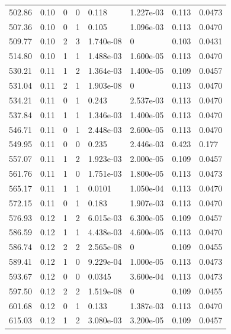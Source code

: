 \documentclass[preview]{standalone}
\begin{document}
{{{\begin{tabular}{L{1.2cm}C{1.2cm} C{0.3cm}C{0.5cm} C{1.4cm}C{1.4cm} C{1.4cm}C{1.4cm}}
  502.86  &  0.10  & 0     &  0 &  0.118  & 1.227e-03  & 0.113 &  0.0473   \\ 
  507.36  &  0.10  & 0     &  1 &  0.105  & 1.096e-03  & 0.113 &  0.0470   \\ 
  509.77  &  0.10  & 2     &  3 &  1.740e-08  & 0  & 0.103 &  0.0431   \\ 
  514.80  &  0.10  & 1     &  1 &  1.488e-03  & 1.600e-05  & 0.113 &  0.0470   \\ 
  530.21  &  0.11  & 1     &  2 &  1.364e-03  & 1.400e-05  & 0.109 &  0.0457   \\ 
  531.04  &  0.11  & 2     &  1 &  1.903e-08  & 0  & 0.113 &  0.0470   \\ 
  534.21  &  0.11  & 0     &  1 &  0.243  & 2.537e-03  & 0.113 &  0.0470   \\ 
  537.84  &  0.11  & 1     &  1 &  1.346e-03  & 1.400e-05  & 0.113 &  0.0470   \\ 
  546.71  &  0.11  & 0     &  1 &  2.448e-03  & 2.600e-05  & 0.113 &  0.0470   \\ 
  549.95  &  0.11  & 0     &  0 &  0.235  & 2.446e-03  & 0.423 &  0.177   \\ 
  557.07  &  0.11  & 1     &  2 &  1.923e-03  & 2.000e-05  & 0.109 &  0.0457   \\ 
  561.76  &  0.11  & 1     &  0 &  1.751e-03  & 1.800e-05  & 0.113 &  0.0473   \\ 
  565.17  &  0.11  & 1     &  1 &  0.0101  & 1.050e-04  & 0.113 &  0.0470   \\ 
  572.15  &  0.11  & 0     &  1 &  0.183  & 1.907e-03  & 0.113 &  0.0470   \\ 
  576.93  &  0.12  & 1     &  2 &  6.015e-03  & 6.300e-05  & 0.109 &  0.0457   \\ 
  586.59  &  0.12  & 1     &  1 &  4.438e-03  & 4.600e-05  & 0.113 &  0.0470   \\ 
  586.74  &  0.12  & 2     &  2 &  2.565e-08  & 0  & 0.109 &  0.0455   \\ 
  589.41  &  0.12  & 1     &  0 &  9.229e-04  & 1.000e-05  & 0.113 &  0.0473   \\ 
  593.67  &  0.12  & 0     &  0 &  0.0345  & 3.600e-04  & 0.113 &  0.0473   \\ 
  597.50  &  0.12  & 2     &  2 &  1.519e-08  & 0  & 0.109 &  0.0455   \\ 
  601.68  &  0.12  & 0     &  1 &  0.133  & 1.387e-03  & 0.113 &  0.0470   \\ 
  615.03  &  0.12  & 1     &  2 &  3.080e-03  & 3.200e-05  & 0.109 &  0.0457   \\ 

\end{tabular}}}}
\end{document}
